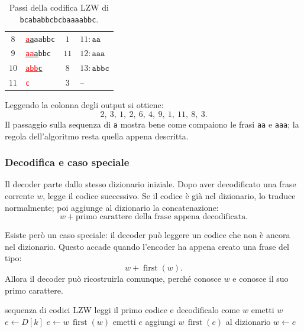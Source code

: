 \documentclass{article}
\theoremstyle{definition}
\numberwithin{equation}{section}
\begin{document}
\begin{table}[H]
\begin{tabular}{c|l|c|l}
        $8$            & \uline{\textcolor{red}{\texttt{a}}\texttt{a}}\texttt{aabbc}            & $1$             & $11:\texttt{aa}$                             \\
        $9$            & \uline{\textcolor{red}{\texttt{aa}}\texttt{a}}\texttt{bbc}             & $11$            & $12:\texttt{aaa}$                            \\
        $10$           & \uline{\textcolor{red}{\texttt{abb}}\texttt{c}}                        & $8$             & $13:\texttt{abbc}$                           \\
        $11$           & \textcolor{red}{\texttt{c}}                                            & $3$             & --
    \end{tabular}
    \caption{Passi della codifica LZW di \texttt{bcababbcbcbaaaabbc}.}
    \label{tab:lzw_encoding_bcababb}
\end{table}

Leggendo la colonna degli output si ottiene:
\[
    2,\ 3,\ 1,\ 2,\ 6,\ 4,\ 9,\ 1,\ 11,\ 8,\ 3.
\]
Il passaggio sulla sequenza di \texttt{a} mostra bene come compaiono le frasi \texttt{aa} e \texttt{aaa}; la regola dell'algoritmo resta quella appena descritta.

\subsubsection{Decodifica e caso speciale}
Il decoder parte dallo stesso dizionario iniziale. Dopo aver decodificato una frase corrente $w$, legge il codice successivo. Se il codice è già nel dizionario, lo traduce normalmente; poi aggiunge al dizionario la concatenazione:
\[
    w + \text{primo carattere della frase appena decodificata}.
\]

Esiste però un caso speciale: il decoder può leggere un codice che non è ancora nel dizionario. Questo accade quando l'encoder ha appena creato una frase del tipo:
\[
    w + \operatorname{first}(w).
\]
Allora il decoder può ricostruirla comunque, perché conosce $w$ e conosce il suo primo carattere.

\begin{algorithm}[htpb]
    \caption{Schema di decodifica LZW}
    \begin{algorithmic}[1]
        \Require sequenza di codici LZW
        \State leggi il primo codice e decodificalo come $w$
        \State emetti $w$
        \State $e\gets D[k]$
        \Else
        \State $e\gets w\,\operatorname{first}(w)$
        \EndIf
        \State emetti $e$
        \State aggiungi $w\,\operatorname{first}(e)$ al dizionario
        \State $w\gets e$
        \EndFor
    \end{algorithmic}
    \label{alg:lzw_decoding}
\end{algorithm}
\end{document}

